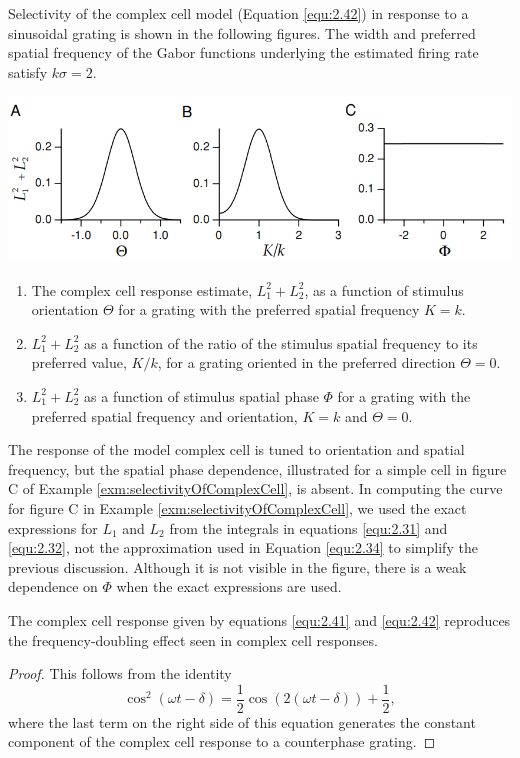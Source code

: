 \begin{exm}
  \label{exm:selectivityOfComplexCell}
  Selectivity of the complex cell model (Equation \ref{equ:2.42}) in response to a sinusoidal grating is shown in the following figures.
  The width and preferred spatial frequency of the Gabor functions underlying the estimated firing rate satisfy $k\sigma = 2$.
  \begin{center}
    \includegraphics[scale=0.3]{./png/spatialPhaseInvariantExm1}
  \end{center}
  \begin{enumerate}[A]
  \item The complex cell response estimate, $L_1^2+L_2^2$, as a function of stimulus orientation $\Theta$ for a grating with the preferred spatial frequency $K = k$.
  \item $L_1^2+L_2^2$ as a function of the ratio of the stimulus spatial frequency to its preferred value, $K/k$, for a grating oriented in the preferred direction $\Theta = 0$.
  \item $L_1^2+L_2^2$ as a function of stimulus spatial phase $\Phi$ for a grating with the preferred spatial frequency and orientation, $K = k$ and $\Theta = 0$.
  \end{enumerate}
\end{exm}

\begin{rem}
  The response of the model complex cell is tuned to orientation and spatial frequency, but the spatial phase dependence, illustrated for a simple cell in figure C of Example \ref{exm:selectivityOfComplexCell}, is absent. In computing the curve for figure C in Example \ref{exm:selectivityOfComplexCell}, we used the exact expressions for $L_1$ and $L_2$ from the integrals in equations \ref{equ:2.31} and \ref{equ:2.32}, not the approximation used in Equation \ref{equ:2.34} to simplify the previous discussion. Although it is not visible in the figure, there is a weak dependence on $\Phi$ when the exact expressions are used.
\end{rem}

\begin{prop}
  The complex cell response given by equations \ref{equ:2.41} and \ref{equ:2.42} reproduces the frequency-doubling effect seen in complex cell responses.
\end{prop}
\begin{proof}
  This follows from the identity
  \begin{equation}
    \label{equ:2.43}
    \cos^2(\omega t-\delta)=\frac{1}{2}\cos(2(\omega t-\delta))+\frac{1}{2},
  \end{equation}
  where the last term on the right side of this equation generates the
constant component of the complex cell response to a counterphase grating.
\end{proof}

